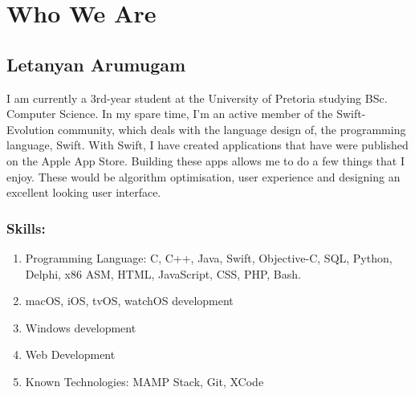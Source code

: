 \documentclass[12pt]{article}
\begin{document}
	\section*{Who We Are}
	\subsection*{Letanyan Arumugam}
	I am currently a 3rd-year student at the University of Pretoria studying BSc. Computer Science. In my spare time, I'm an 	active member of the Swift-Evolution community, which deals with the language design of, the programming language, Swift. With Swift, I have created applications that have were published on the Apple App Store. Building these apps allows me to do a few things that I enjoy. These would be algorithm optimisation, user experience and designing an excellent looking user interface.	
	\newline
	\subsubsection*{Skills:}
	\begin{enumerate}
	\item Programming Language: C, C++, Java, Swift, Objective-C, SQL, Python, Delphi, x86 ASM, HTML, JavaScript, CSS, PHP, Bash.
	\item macOS, iOS, tvOS, watchOS development
	\item Windows development
	\item Web Development
	\item Known Technologies: MAMP Stack, Git, XCode
	\end{enumerate}
\end{document}
